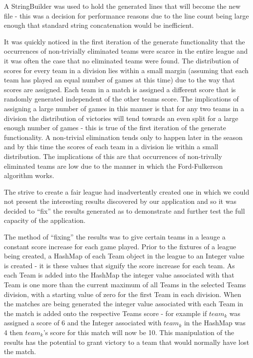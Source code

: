A StringBuilder was used to hold the generated lines that will become
the new file - this was a decision for performance reasons due to the
line count being large enough that standard string concatenation would
be inefficient.

It was quickly noticed in the first iteration of the generate
functionality that the occurrences of non-trivially eliminated teams
were scarce in the entire league and it was often the case that no
eliminated teams were found. The distribution of scores for every team
in a division lies within a small margin (assuming that each team has
played an equal number of games at this time) due to the way that
scores are assigned. Each team in a match is assigned a different
score that is randomly generated independent of the other teams
score. The implications of assigning a large number of games in this
manner is that for any two teams in a division the distribution of
victories will tend towards an even split for a large enough number of
games - this is true of the first iteration of the generate
functionality. A non-trivial elimination tends only to happen later in
the season and by this time the scores of each team in a division lie
within a small distribution. The implications of this are that
occurrences of non-trivally eliminated teams are low due to the manner
in which the Ford-Fulkerson algorithm works.


The strive to create a fair league had inadvertently created one in
which we could not present the interesting results discovered by our
application and so it was decided to ``fix'' the results generated as
to demonstrate and further test the full capacity of the application.

The method of ``fixing'' the results was to give certain teams in a
leauge a constant score increase for each game played.
Prior to the fixtures of a league being created, a HashMap of each
Team object in the league to an Integer value is created - it is
these values that signify the score increase for each team. As each
Team is added into the HashMap the integer value associated with that
Team is one more than the current maximum of all Teams in the selected
Teams division, with a starting value of zero for the first Team in
each division. When the matches are being generated the integer value
associated with each Team in the match is added onto the respective
Teams score - for example if $team_k$ was assigned a score of 6 and the
Integer associated with $team_k$ in the HashMap was 4 then $team_k$'s
score for this match will now be 10. This manipulation of the results
has the potential to grant victory to a team that would normally have
lost the match.

